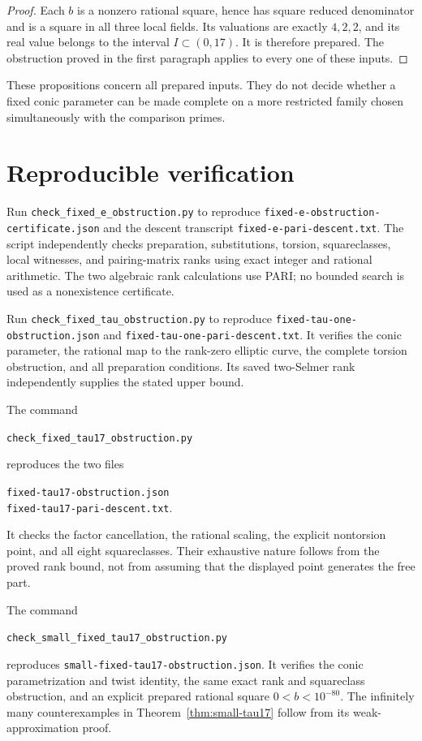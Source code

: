 \documentclass[11pt,a4paper]{article}
\theoremstyle{definition}\newtheorem{definition}[theorem]{Definition}
\begin{document}
\begin{proof}
Each $b$ is a nonzero rational square, hence has square reduced
denominator and is a square in all three local fields. Its
valuations are exactly $4,2,2$, and its real value belongs to
the interval $I\subset(0,17)$. It is therefore prepared. The obstruction
proved in the first paragraph applies to every one of these inputs.
\end{proof}

These propositions concern all prepared inputs. They do not decide
whether a fixed conic parameter can be made complete on a more
restricted family chosen simultaneously with the comparison primes.

\section*{Reproducible verification}

Run \nolinkurl{check_fixed_e_obstruction.py} to reproduce
\nolinkurl{fixed-e-obstruction-certificate.json} and the descent
transcript \nolinkurl{fixed-e-pari-descent.txt}.
The script independently checks preparation, substitutions, torsion,
squareclasses, local witnesses, and pairing-matrix ranks using exact
integer and rational arithmetic. The two algebraic rank calculations
use PARI; no bounded search is used as a nonexistence certificate.

Run \nolinkurl{check_fixed_tau_obstruction.py} to reproduce
\nolinkurl{fixed-tau-one-obstruction.json} and
\nolinkurl{fixed-tau-one-pari-descent.txt}. It verifies the conic
parameter, the rational map to the rank-zero elliptic curve, the
complete torsion obstruction, and all preparation conditions. Its
saved two-Selmer rank independently supplies the stated upper bound.

The command
\begin{center}\small
\nolinkurl{check_fixed_tau17_obstruction.py}
\end{center}
reproduces the two files
\begin{center}\small
\nolinkurl{fixed-tau17-obstruction.json}\\
\nolinkurl{fixed-tau17-pari-descent.txt}.
\end{center}
It checks the factor
cancellation, the rational scaling, the explicit nontorsion point,
and all eight squareclasses. Their exhaustive nature follows from
the proved rank bound, not from assuming that the displayed point
generates the free part.

The command
\begin{center}\small
\nolinkurl{check_small_fixed_tau17_obstruction.py}
\end{center}
reproduces \nolinkurl{small-fixed-tau17-obstruction.json}.
It verifies the conic
parametrization and twist identity, the same exact rank and squareclass
obstruction, and an explicit prepared rational square $0<b<10^{-80}$.
The infinitely many counterexamples in
Theorem~\ref{thm:small-tau17} follow from its weak-approximation proof.
\end{document}
